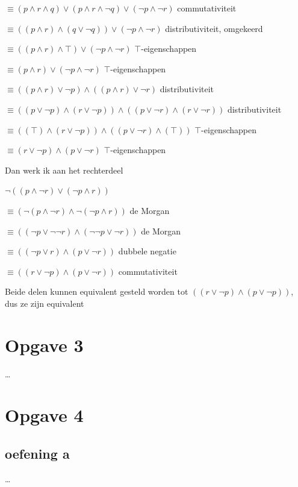 \documentclass[11pt, a4paper]{article}
\begin{document}
$\equiv (p \land r \land q) \lor (p \land r \land \neg q) \lor (\neg p \land \neg r)$ \hfill commutativiteit

$\equiv ((p \land r) \land (q \lor \neg q)) \lor (\neg p \land \neg r)$ \hfill distributiviteit, omgekeerd

$\equiv ((p \land r) \land \top) \lor (\neg p \land \neg r)$ \hfill $\top$-eigenschappen

$\equiv (p \land r) \lor (\neg p \land \neg r)$ \hfill $\top$-eigenschappen

$\equiv ((p \land r) \lor \neg p) \land ((p \land r) \lor \neg r)$ \hfill distributiviteit

$\equiv ((p \lor \neg p) \land (r \lor \neg p)) \land ((p \lor \neg r) \land (r \lor \neg r))$ \hfill distributiviteit

$\equiv ((\top) \land (r \lor \neg p)) \land ((p \lor \neg r) \land (\top))$ \hfill $\top$-eigenschappen

$\equiv (r \lor \neg p) \land (p \lor \neg r)$ \hfill $\top$-eigenschappen


Dan werk ik aan het rechterdeel

$\neg ((p \land \neg r) \lor (\neg p \land r))$

$\equiv (\neg(p \land \neg r) \land \neg(\neg p \land r))$ \hfill de Morgan

$\equiv ((\neg p \lor \neg \neg r) \land (\neg \neg p \lor \neg r))$ \hfill de Morgan

$\equiv ((\neg p \lor r) \land (p \lor \neg r))$ \hfill dubbele negatie

$\equiv ((r \lor \neg p) \land (p \lor \neg r))$ \hfill commutativiteit

Beide delen kunnen equivalent gesteld worden tot $((r \lor \neg p) \land (p \lor \neg p))$, dus ze zijn equivalent



\pagebreak
\section*{Opgave 3}
\ldots

\pagebreak
\section*{Opgave 4}
\subsection*{oefening a}
\ldots
\end{document}
